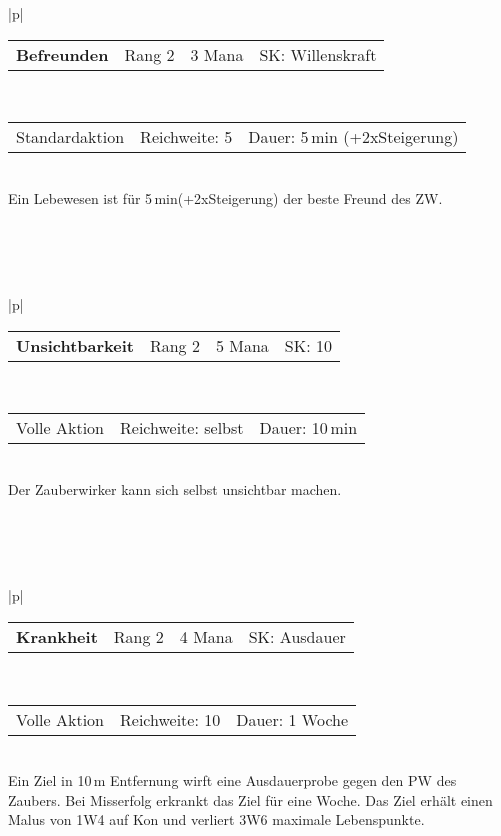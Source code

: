 \documentclass[../../Heldenanleitung2]{subfiles}
\begin{document}
\begin{tabular}{|p{\textwidth}|}
\hline
\begin{tabularx}{\textwidth}{X|X|X|X}
\textbf{Befreunden} & Rang 2 & 3 Mana & SK: Willenskraft
\end{tabularx} \\ \hline
\begin{tabularx}{\textwidth}{X|X|X}
Standardaktion & Reichweite: 5 & Dauer: 5\,min (+2xSteigerung)
\end{tabularx} \\ \hline
Ein Lebewesen ist für 5\,min(+2xSteigerung) der beste Freund des ZW.
\\ \hline
\end{tabular}
\\\\\\
\begin{tabular}{|p{\textwidth}|}
\hline
\begin{tabularx}{\textwidth}{X|X|X|X}
\textbf{Unsichtbarkeit} & Rang 2 & 5 Mana & SK: 10
\end{tabularx} \\ \hline
\begin{tabularx}{\textwidth}{X|X|X}
Volle Aktion & Reichweite: selbst & Dauer: 10\,min
\end{tabularx} \\ \hline
Der Zauberwirker kann sich selbst unsichtbar machen.
\\ \hline
\end{tabular}
\\\\\\
\begin{tabular}{|p{\textwidth}|}
\hline
\begin{tabularx}{\textwidth}{X|X|X|X}
\textbf{Krankheit} & Rang 2 & 4 Mana & SK: Ausdauer
\end{tabularx} \\ \hline
\begin{tabularx}{\textwidth}{X|X|X}
Volle Aktion & Reichweite: 10 & Dauer: 1 Woche
\end{tabularx} \\ \hline
Ein Ziel in 10\,m Entfernung wirft eine Ausdauerprobe gegen den PW des Zaubers. Bei Misserfolg erkrankt das Ziel für eine Woche. Das Ziel erhält einen Malus von 1W4 auf Kon und verliert 3W6 maximale Lebenspunkte.
\\ \hline
\end{tabular}
\\\\\\
\end{document}
